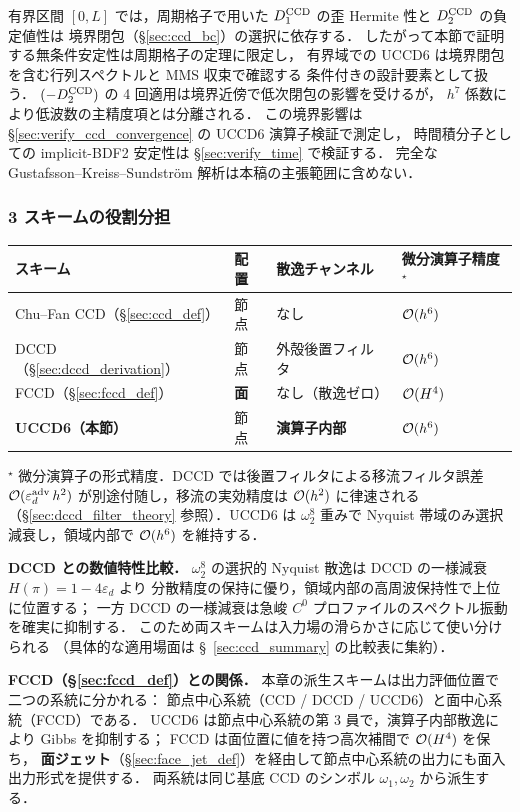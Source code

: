 有界区間 $[0,L]$ では，周期格子で用いた
$D_1^{\mathrm{CCD}}$ の歪 Hermite 性と $D_2^{\mathrm{CCD}}$ の負定値性は
境界閉包（§\ref{sec:ccd_bc}）の選択に依存する．
したがって本節で証明する無条件安定性は周期格子の定理に限定し，
有界域での UCCD6 は境界閉包を含む行列スペクトルと MMS 収束で確認する
条件付きの設計要素として扱う．
$(-D_2^{\mathrm{CCD}})$ の 4 回適用は境界近傍で低次閉包の影響を受けるが，
$h^7$ 係数により低波数の主精度項とは分離される．
この境界影響は §\ref{sec:verify_ccd_convergence} の UCCD6 演算子検証で測定し，
時間積分子としての implicit-BDF2 安定性は §\ref{sec:verify_time} で検証する．
完全な Gustafsson--Kreiss--Sundstr\"om 解析は本稿の主張範囲に含めない．

\subsubsection{3 スキームの役割分担}
\label{sec:uccd6_scheme_comparison}

\begin{center}
\begin{tabular}{l l l l}
\hline
\textbf{スキーム} & \textbf{配置} & \textbf{散逸チャンネル} & \textbf{微分演算子精度}$^\star$ \\ \hline
Chu--Fan CCD（§\ref{sec:ccd_def}） & 節点 & なし & $\mathcal{O}(h^6)$ \\
DCCD（§\ref{sec:dccd_derivation}） & 節点 & 外殻後置フィルタ & $\mathcal{O}(h^6)$ \\
FCCD（§\ref{sec:fccd_def}） & \textbf{面} & なし（散逸ゼロ） & $\mathcal{O}(H^4)$ \\
\textbf{UCCD6（本節）} & 節点 & \textbf{演算子内部} & $\mathcal{O}(h^6)$ \\
\hline
\end{tabular}
\end{center}

{\footnotesize $^\star$ 微分演算子の形式精度．DCCD では後置フィルタによる移流フィルタ誤差 $\mathcal{O}(\varepsilon_d^\text{adv}\,h^2)$ が別途付随し，移流の実効精度は $\mathcal{O}(h^2)$ に律速される（§\ref{sec:dccd_filter_theory} 参照）．UCCD6 は $\omega_2^8$ 重みで Nyquist 帯域のみ選択減衰し，領域内部で $\mathcal{O}(h^6)$ を維持する．}

\noindent
\textbf{DCCD との数値特性比較．}
$\omega_2^8$ の選択的 Nyquist 散逸は DCCD の一様減衰 $H(\pi)=1-4\varepsilon_d$ より
分散精度の保持に優り，領域内部の高周波保持性で上位に位置する；
一方 DCCD の一様減衰は急峻 $C^0$ プロファイルのスペクトル振動を確実に抑制する．
このため両スキームは入力場の滑らかさに応じて使い分けられる
（具体的な適用場面は §~\ref{sec:ccd_summary} の比較表に集約）．

\noindent
\textbf{FCCD（§\ref{sec:fccd_def}）との関係．}
本章の派生スキームは出力評価位置で二つの系統に分かれる：
節点中心系統（CCD / DCCD / UCCD6）と面中心系統（FCCD）である．
UCCD6 は節点中心系統の第 3 員で，演算子内部散逸により Gibbs を抑制する；
FCCD は面位置に値を持つ高次補間で $\mathcal{O}(H^4)$ を保ち，
\textbf{面ジェット}（§\ref{sec:face_jet_def}）を経由して節点中心系統の出力にも面入出力形式を提供する．
両系統は同じ基底 CCD のシンボル $\omega_1, \omega_2$ から派生する．

